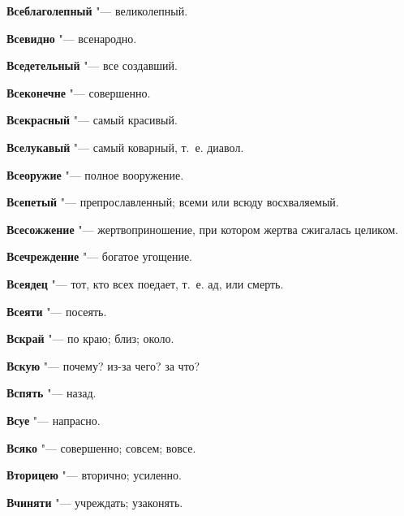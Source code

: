 \begin{mymulticols}{2}
\noindent\textbf{Всеблаголепный} "--- великолепный. 




\noindent\textbf{Всевидно} "--- всенародно. 




\noindent\textbf{Вседетельный} "--- все создавший. 




\noindent\textbf{Всеконечне} "--- совершенно. 




\noindent\textbf{Всекрасный} "--- самый красивый. 




\noindent\textbf{Вселукавый} "--- самый коварный, т.~е. диавол. 




\noindent\textbf{Всеоружие} "--- полное вооружение. 




\noindent\textbf{Всепетый} "--- препрославленный; всеми или всюду восхваляемый. 




\noindent\textbf{Всесожжение} "--- жертвоприношение, при котором жертва сжигалась целиком. 




\noindent\textbf{Всечреждение} "--- богатое угощение. 




\noindent\textbf{Всеядец} "--- тот, кто всех поедает, т.~е. ад, или смерть. 




\noindent\textbf{Всеяти} "--- посеять. 




\noindent\textbf{Вскрай} "--- по краю; близ; около. 




\noindent\textbf{Вскую} "--- почему? из-за чего? за что? 




\noindent\textbf{Вспять} "--- назад. 




\noindent\textbf{Всуе} "--- напрасно. 




\noindent\textbf{Всяко} "--- совершенно; совсем; вовсе. 




\noindent\textbf{Вторицею} "--- вторично; усиленно. 




\noindent\textbf{Вчиняти} "--- учреждать; узаконять. 





\end{mymulticols}
